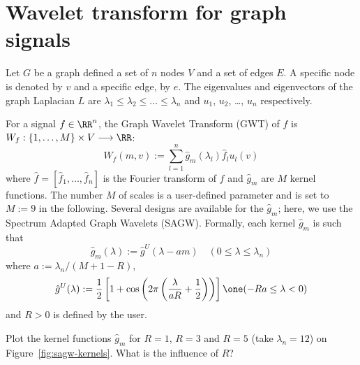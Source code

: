 \documentclass[11pt]{article}
\begin{document}
\newpage
\section{Wavelet transform for graph signals}
Let $G$ be a graph defined a set of $n$ nodes $V$ and a set of edges $E$. A specific node is denoted by $v$ and a specific edge, by $e$.
The eigenvalues and eigenvectors of the graph Laplacian $L$ are $\lambda_1\leq\lambda_2\leq\dots\leq \lambda_n$ and $u_1$, $u_2$, \dots, $u_n$ respectively.

For a signal $f\in\RR^{n}$, the Graph Wavelet Transform (GWT) of $f$ is $ W_f: \{1,\dots,M\}\times V \longrightarrow \RR$:
\begin{equation}
    W_f(m, v) := \sum_{l=1}^n \hat{g}_m(\lambda_l)\hat{f}_l u_l(v)
\end{equation}
where $\hat{f}= [\hat{f}_1,\dots,\hat{f}_n]$ is the Fourier transform of $f$ and $\hat{g}_m$ are $M$ kernel functions.
The number $M$ of scales is a user-defined parameter and is set to $M:=9$ in the following.
Several designs are available for the $\hat{g}_m$; here, we use the Spectrum Adapted Graph Wavelets (SAGW).
Formally, each kernel $\hat{g}_m$ is such that
\begin{equation}
    \hat{g}_m(\lambda) := \hat{g}^U(\lambda - am) \quad (0\leq\lambda\leq\lambda_n)
\end{equation}
where $a:=\lambda_n / (M+1-R)$,
\begin{equation}
    \hat{g}^U(\lambda) := \frac{1}{2}\left[ 1 + \cos\left( 2\pi\left(\frac{\lambda}{a R}  + \frac{1}{2} \right)\right) \right]\one(-Ra \leq \lambda < 0)
\end{equation}
and $R>0$ is defined by the user.

\begin{exercise}
Plot the kernel functions $\hat{g}_m$ for $R=1$, $R=3$ and $R=5$ (take $\lambda_n=12$) on Figure~\ref{fig:sagw-kernels}. What is the influence of $R$?
\end{exercise}
\end{document}

